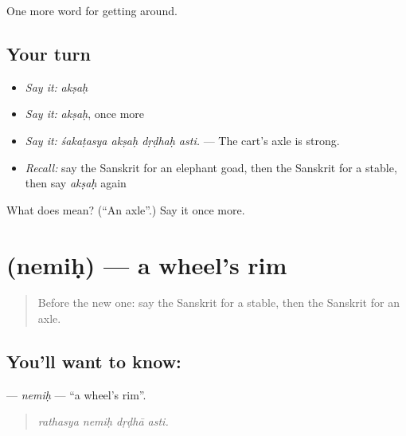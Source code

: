 \begin{grammarlens}[title={What you've built}]
One more word for getting around.
\end{grammarlens}

\subsection*{Your turn}
\begin{itemize}
\raggedright
  \item \emph{Say it:} \emph{akṣaḥ}
  \item \emph{Say it:} \emph{akṣaḥ}, once more
  \item \emph{Say it:} \emph{śakaṭasya akṣaḥ dṛḍhaḥ asti.} — The cart's axle is strong.
  \item \emph{Recall:} say the Sanskrit for an elephant goad, then the Sanskrit for a stable, then say \emph{akṣaḥ} again
\end{itemize}

\begin{tcolorbox}[breakable,colback=teal!4,colframe=teal!35!black,title={Before you move on}]
What does  mean? (\textquotedblleft{}An axle\textquotedblright{}.) Say it once more.
\end{tcolorbox}
\section[\texorpdfstring{\sk{नेमिः} (nemiḥ)}{नेमिः (nemiḥ)}]{ (nemiḥ) — a wheel's rim}

\label{lesson:SA-C409-nemih}



\begin{quote}
Before the new one: say the Sanskrit for a stable, then the Sanskrit for an axle.
\end{quote}

\subsection*{You'll want to know: }
\textbf{} — \emph{nemiḥ} — \textquotedblleft{}a wheel's rim\textquotedblright{}.

\begin{quote}
   
\end{quote}

\begin{quote}
\emph{rathasya nemiḥ dṛḍhā asti.}
\end{quote}

